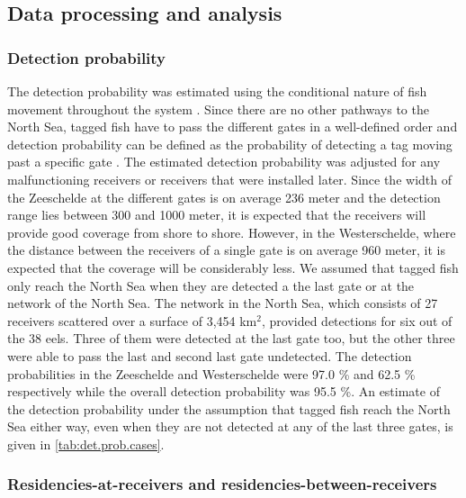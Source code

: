 \documentclass[preprint,12pt,authoryear]{elsarticle}
\begin{document}
\begin{spacing}{1.9}
\subsection{Data processing and analysis}

\subsubsection{Detection probability}

The detection probability was estimated using the conditional nature of fish movement throughout the system \citep{Brownscombe2019ConductingManagers}. Since there are no other pathways to the North Sea, tagged fish have to pass the different gates in a well-defined order and detection probability can be defined as the probability of detecting a tag moving past a specific gate \citep{Melnychuk2012,Perry2012UsingData}. The estimated detection probability was adjusted for any malfunctioning receivers or receivers that were installed later. Since the width of the Zeeschelde at the different gates is on average 236 meter and the detection range lies between 300 and 1000 meter, it is expected that the receivers will provide good coverage from shore to shore. However, in the Westerschelde, where the distance between the receivers of a single gate is on average 960 meter, it is expected that the coverage will be considerably less. We assumed that tagged fish only reach the North Sea when they are detected a the last gate or at the network of the North Sea. The network in the North Sea, which consists of 27 receivers scattered over a surface of 3,454 km$^2$, provided detections for six out of the 38 eels. Three of them were detected at the last gate too, but the other three were able to pass the last and second last gate undetected. The detection probabilities in the Zeeschelde and Westerschelde were 97.0 \% and 62.5 \% respectively while the overall detection probability was 95.5 \%. An estimate of the detection probability under the assumption that tagged fish reach the North Sea either way, even when they are not detected at any of the last three gates, is given in \ref{tab:det.prob.cases}.

\subsubsection{Residencies-at-receivers and residencies-between-receivers}


\end{spacing}
\end{document}
